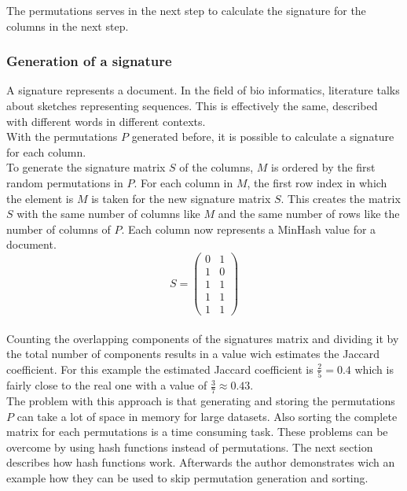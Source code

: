 The permutations serves in the next step to calculate the signature for the columns in the next step.\\

\subsubsection{Generation of a signature}

A signature represents a document. In the field of bio informatics, literature talks about sketches representing sequences. This is effectively the same, described with different words in different contexts.\\

With the permutations $ P $ generated before, it is possible to calculate a signature for each column.\\

To generate the signature matrix $ S $ of the columns, $ M $ is ordered by the first random permutations in $ P $. For each column in $ M $, the first row index in which the element is $ M $ is taken for the new signature matrix $ S $. This creates the matrix $ S $ with the same number of columns like $ M $ and the same number of rows like the number of columns of $ P $. Each column now represents a MinHash value for a document.\\

\begin{equation}
    S = 
    \begin{pmatrix}
        0 & 1 \\
        1 & 0 \\
        1 & 1 \\
        1 & 1 \\
        1 & 1
    \end{pmatrix}
\end{equation} \\

Counting the overlapping components of the signatures matrix and dividing it by the total number of components results in a value wich estimates the Jaccard coefficient. For this example the estimated Jaccard coefficient is $ \frac{2}{5} = 0.4 $ which is fairly close to the real one with a value of $ \frac{3}{7} \approx 0.43 $.\\

The problem with this approach is that generating and storing the permutations $ P $ can take a lot of space in memory for large datasets. Also sorting the complete matrix for each permutations is a time consuming task. These problems can be overcome by using hash functions instead of permutations. The next section describes how hash functions work. Afterwards the author demonstrates wich an example how they can be used to skip permutation generation and sorting.\\

